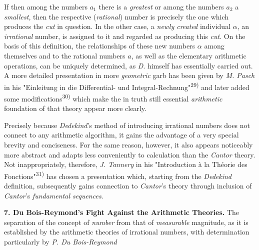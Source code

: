 \thispagestyle{fancy}

\vspace{0.5cm}

If then among the numbers $a_1$ there is a \textit{greatest} or among the numbers $a_2$ a \textit{smallest}, then the respective (\textit{rational}) number is precisely the one which produces the \textit{cut} in question. In the other case, a \textit{newly created} individual $\alpha$, an \textit{irrational} number, is assigned to it and regarded as producing this \textit{cut}. On the basis of this definition, the relationships of these new numbers $\alpha$ among themselves and to the rational numbers $a$, as well as the elementary arithmetic operations, can be uniquely determined, as \textit{D}. himself has essentially carried out. A more detailed presentation in more \textit{geometric} garb has been given by \textit{M. Pasch} in his "Einleitung in die Differential- und Integral-Rechnung"\textsuperscript{29)} and later added some modifications\textsuperscript{30)} which make the in truth still essential \textit{arithmetic} foundation of that theory appear more clearly.

Precisely because \textit{Dedekind}'s method of introducing irrational numbers does not connect to any arithmetic algorithm, it gains the advantage of a very special brevity and conciseness. For the same reason, however, it also appears noticeably more abstract and adapts less conveniently to calculation than the \textit{Cantor} theory. Not inappropriately, therefore, \textit{J. Tannery} in his "Introduction à la Théorie des Fonctions"\textsuperscript{31)} has chosen a presentation which, starting from the \textit{Dedekind} definition, subsequently gains connection to \textit{Cantor}'s theory through inclusion of \textit{Cantor}'s \textit{fundamental sequences}.

\vspace{0.5cm}

\textbf{7. Du Bois-Reymond's Fight Against the Arithmetic Theories.} The separation of the concept of \textit{number} from that of \textit{measurable} magnitude, as it is established by the arithmetic theories of irrational numbers, with determination particularly by \textit{P. Du Bois-Reymond}

